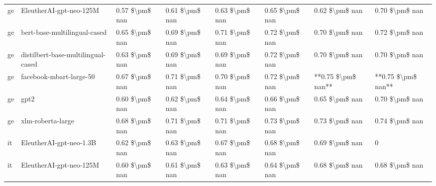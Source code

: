 \begin{tabular}{llllllll}
      ge &            EleutherAI-gpt-neo-125M & 0.57 \$\textbackslash pm\$ nan &            0.61 \$\textbackslash pm\$ nan &        0.63 \$\textbackslash pm\$ nan &         0.65 \$\textbackslash pm\$ nan &                          0.62 \$\textbackslash pm\$ nan &     0.70 \$\textbackslash pm\$ nan \\
      ge &       bert-base-multilingual-cased & 0.65 \$\textbackslash pm\$ nan &            0.69 \$\textbackslash pm\$ nan &        0.71 \$\textbackslash pm\$ nan &         0.72 \$\textbackslash pm\$ nan &                          0.70 \$\textbackslash pm\$ nan &     0.72 \$\textbackslash pm\$ nan \\
      ge & distilbert-base-multilingual-cased & 0.63 \$\textbackslash pm\$ nan &            0.69 \$\textbackslash pm\$ nan &        0.69 \$\textbackslash pm\$ nan &         0.72 \$\textbackslash pm\$ nan &                          0.70 \$\textbackslash pm\$ nan &     0.70 \$\textbackslash pm\$ nan \\
      ge &            facebook-mbart-large-50 & 0.67 \$\textbackslash pm\$ nan &            0.71 \$\textbackslash pm\$ nan &        0.70 \$\textbackslash pm\$ nan &         0.72 \$\textbackslash pm\$ nan &                      **0.75 \$\textbackslash pm\$ nan** & **0.75 \$\textbackslash pm\$ nan** \\
      ge &                               gpt2 & 0.60 \$\textbackslash pm\$ nan &            0.62 \$\textbackslash pm\$ nan &        0.64 \$\textbackslash pm\$ nan &         0.66 \$\textbackslash pm\$ nan &                          0.65 \$\textbackslash pm\$ nan &     0.70 \$\textbackslash pm\$ nan \\
      ge &                  xlm-roberta-large & 0.68 \$\textbackslash pm\$ nan &            0.71 \$\textbackslash pm\$ nan &        0.71 \$\textbackslash pm\$ nan &         0.73 \$\textbackslash pm\$ nan &                          0.73 \$\textbackslash pm\$ nan &     0.74 \$\textbackslash pm\$ nan \\
      it &            EleutherAI-gpt-neo-1.3B & 0.62 \$\textbackslash pm\$ nan &            0.63 \$\textbackslash pm\$ nan &        0.67 \$\textbackslash pm\$ nan &         0.68 \$\textbackslash pm\$ nan &                          0.69 \$\textbackslash pm\$ nan &                  0 \\
      it &            EleutherAI-gpt-neo-125M & 0.60 \$\textbackslash pm\$ nan &            0.61 \$\textbackslash pm\$ nan &        0.63 \$\textbackslash pm\$ nan &         0.64 \$\textbackslash pm\$ nan &                          0.68 \$\textbackslash pm\$ nan &     0.68 \$\textbackslash pm\$ nan \\

\end{tabular}
